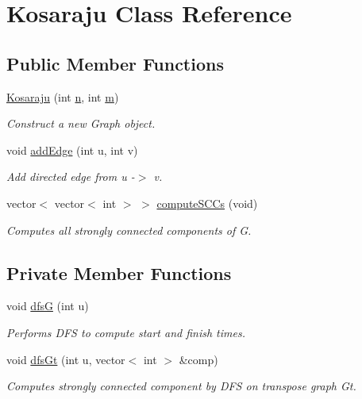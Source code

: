 \hypertarget{classKosaraju}{}\section{Kosaraju Class Reference}
\label{classKosaraju}
\subsection*{Public Member Functions}
\begin{DoxyCompactItemize}
\item 
\mbox{\hyperlink{classKosaraju_a0ef4ff4f55746c3a1a73a1209edfa148}{Kosaraju}} (int \mbox{\hyperlink{classKosaraju_a43acb7cefc69ce4e11c93ececce01ecb}{n}}, int \mbox{\hyperlink{classKosaraju_a7fdb8e3b71f5c02717859fdaa6a4be7a}{m}})
\begin{DoxyCompactList}\small\item\em Construct a new Graph object. \end{DoxyCompactList}\item 
void \mbox{\hyperlink{classKosaraju_a5823c2fbedc3a02653c78277138b9d55}{add\+Edge}} (int u, int v)
\begin{DoxyCompactList}\small\item\em Add directed edge from u -\/$>$ v. \end{DoxyCompactList}\item 
vector$<$ vector$<$ int $>$ $>$ \mbox{\hyperlink{classKosaraju_ae283595a4b00f90229ebb6a2f8a66f61}{compute\+S\+C\+Cs}} (void)
\begin{DoxyCompactList}\small\item\em Computes all strongly connected components of G. \end{DoxyCompactList}\end{DoxyCompactItemize}
\subsection*{Private Member Functions}
\begin{DoxyCompactItemize}
\item 
void \mbox{\hyperlink{classKosaraju_a0001d8a4780d0b7fced804ed3b1fc972}{dfsG}} (int u)
\begin{DoxyCompactList}\small\item\em Performs D\+FS to compute start and finish times. \end{DoxyCompactList}\item 
void \mbox{\hyperlink{classKosaraju_a7168221343761e5db6cac1dfe04882bb}{dfs\+Gt}} (int u, vector$<$ int $>$ \&comp)
\begin{DoxyCompactList}\small\item\em Computes strongly connected component by D\+FS on transpose graph Gt. \end{DoxyCompactList}\end{DoxyCompactItemize}
